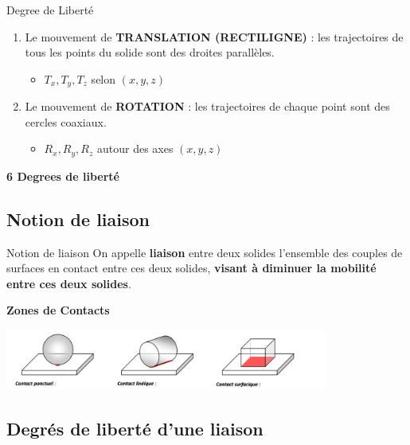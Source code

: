 \documentclass[
  ignorenonframetext,
  aspectratio=169,
  c]{beamer}
\providecommand{\tightlist}{%
  \setlength{\itemsep}{0pt}\setlength{\parskip}{0pt}}\usepackage{longtable,booktabs,array}
\begin{document}
\begin{frame}{Degree de Liberté}
\label{degree-de-libertuxe9-1}
\begin{enumerate}
\tightlist
\item
  Le mouvement de \textbf{TRANSLATION (RECTILIGNE)} : les trajectoires
  de tous les points du solide sont des droites parallèles.

  \begin{itemize}
  \tightlist
  \item
    \(T_x, T_y, T_z\) selon \((x,y,z)\)
  \end{itemize}
\item
  Le mouvement de \textbf{ROTATION} : les trajectoires de chaque point
  sont des cercles coaxiaux.

  \begin{itemize}
  \tightlist
  \item
    \(R_x, R_y, R_z\) autour des axes \((x,y,z)\)
  \end{itemize}
\end{enumerate}

\textbf{6 Degrees de liberté}
\end{frame}

\subsection{Notion de liaison}\label{notion-de-liaison}

\begin{frame}{Notion de liaison}
On appelle \textbf{liaison} entre deux solides l'ensemble des couples de
surfaces en contact entre ces deux solides, \textbf{visant à diminuer la
mobilité entre ces deux solides}.

\textbf{Zones de Contacts}

\begin{center}
\includegraphics[width=0.8\textwidth,height=\textheight]{CM3/Contact.png}
\end{center}
\end{frame}

\subsection{Degrés de liberté d'une
liaison}\label{degruxe9s-de-libertuxe9-dune-liaison}
\end{document}
